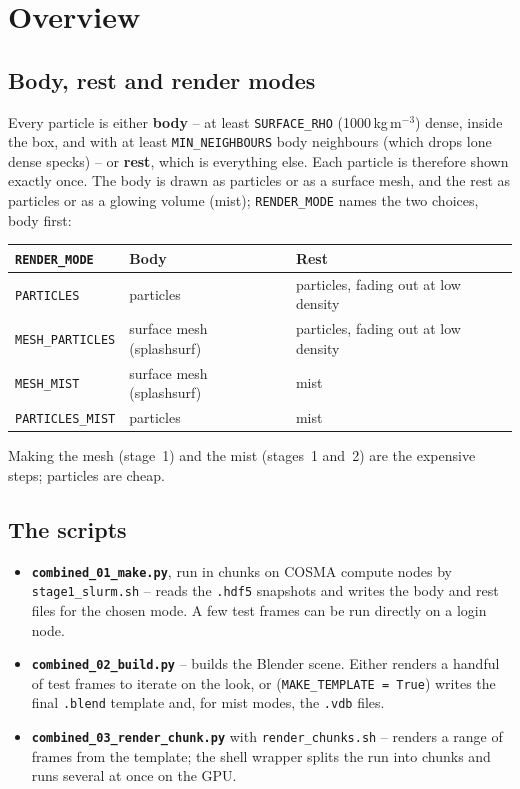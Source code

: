 \documentclass[11pt]{article}
\newcommand{\pc}[1]{\texttt{#1}}
\begin{document}
\section{Overview}
 
\subsection{Body, rest and render modes}
Every particle is either \textbf{body} -- at least \pc{SURFACE\_RHO} (1000\,kg\,m$^{-3}$) dense, inside the box, and with at least \pc{MIN\_NEIGHBOURS} body neighbours (which drops lone dense specks) -- or \textbf{rest}, which is everything else. Each particle is therefore shown exactly once. The body is drawn as particles or as a surface mesh, and the rest as particles or as a glowing volume (mist); \pc{RENDER\_MODE} names the two choices, body first:
 
\begin{center}\small
\begin{tabular}{@{}P{3.2cm} P{5.2cm} P{6.1cm}@{}}
\hline
\textbf{\pc{RENDER\_MODE}} & \textbf{Body} & \textbf{Rest} \\
\hline
\pc{PARTICLES}       & particles & particles, fading out at low density \\
\pc{MESH\_PARTICLES} & surface mesh (splashsurf) & particles, fading out at low density \\
\pc{MESH\_MIST}      & surface mesh (splashsurf) & mist \\
\pc{PARTICLES\_MIST} & particles & mist \\
\hline
\end{tabular}
\end{center}
 
Making the mesh (stage~1) and the mist (stages~1 and~2) are the expensive steps; particles are cheap.
 
\subsection{The scripts}
\begin{itemize}
  \item \textbf{\pc{combined\_01\_make.py}}, run in chunks on COSMA compute nodes by \pc{stage1\_slurm.sh} -- reads the \pc{.hdf5} snapshots and writes the body and rest files for the chosen mode. A few test frames can be run directly on a login node.
  \item \textbf{\pc{combined\_02\_build.py}} -- builds the Blender scene. Either renders a handful of test frames to iterate on the look, or (\pc{MAKE\_TEMPLATE = True}) writes the final \pc{.blend} template and, for mist modes, the \pc{.vdb} files.
  \item \textbf{\pc{combined\_03\_render\_chunk.py}} with \pc{render\_chunks.sh} -- renders a range of frames from the template; the shell wrapper splits the run into chunks and runs several at once on the GPU.
\end{itemize}
 
\end{document}
